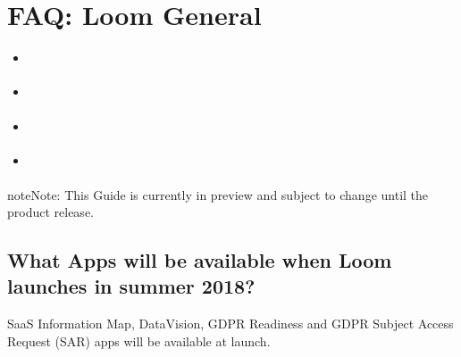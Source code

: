 \documentclass[letterpaper,10pt,english]{sphinxmanual}
\begin{document}
\chapter{FAQ: Loom General}
\label{\detokenize{loom_trbs_faq:loom-how-to-faq-and-troubleshooting-guide}}\label{\detokenize{loom_trbs_faq:trbs-faq-content}}\label{\detokenize{loom_trbs_faq:faq-loom-general}}\label{\detokenize{loom_trbs_faq:faq-loom-gen}}
\begin{sphinxShadowBox}
\begin{itemize}
\item {} 
\label{\detokenize{loom_trbs_faq:id27}}{\hyperref[\detokenize{loom_trbs_faq:what-apps-will-be-available-when-loom-launches-in-summer-2018}]{}}

\item {} 
\label{\detokenize{loom_trbs_faq:id28}}{\hyperref[\detokenize{loom_trbs_faq:will-there-be-any-functionality-loss-when-information-map-and-data-insight-are-rolled-into-one-product}]{}}

\item {} 
\label{\detokenize{loom_trbs_faq:id29}}{\hyperref[\detokenize{loom_trbs_faq:will-data-insight-be-able-to-look-at-netbackup-catalog-data}]{}}

\item {} 
\label{\detokenize{loom_trbs_faq:id30}}{\hyperref[\detokenize{loom_trbs_faq:when-will-the-on-premises-version-of-loom-be-released}]{}}

\end{itemize}
\end{sphinxShadowBox}

\begin{sphinxadmonition}{note}{Note:}
This Guide is currently in preview and subject to change until the product release.
\end{sphinxadmonition}


\section{What Apps will be available when Loom launches in summer 2018?}
\label{\detokenize{loom_trbs_faq:what-apps-will-be-available-when-loom-launches-in-summer-2018}}
SaaS Information Map, DataVision, GDPR Readiness and GDPR Subject Access Request (SAR) apps will be available at launch.
\end{document}
